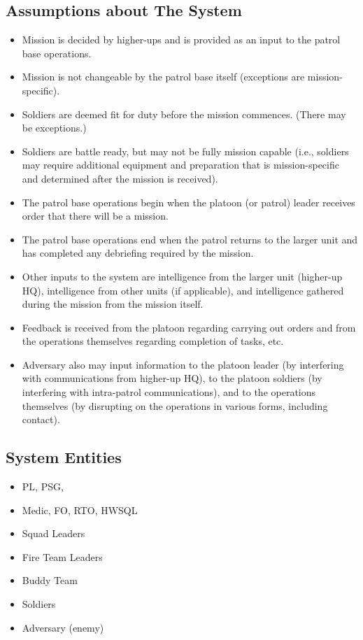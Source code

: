 \documentclass[../../main/main.tex]{subfiles}
\begin{document}
\subsection{Assumptions about The System}
\begin{itemize}
\item Mission is decided by higher-ups and is provided as an input to the patrol base operations.
\item Mission is not changeable by the patrol base itself (exceptions are mission-specific).
\item Soldiers are deemed fit for duty before the mission commences.   (There may be exceptions.)
\item Soldiers are battle ready, but may not be fully mission capable (i.e., soldiers may require additional equipment and preparation that is mission-specific and determined after the mission is received).
\item The patrol base operations begin when the platoon (or patrol) leader receives order that there will be a mission.
\item The patrol base operations end when the patrol returns to the larger unit and has completed any debriefing required by the mission.
\item Other inputs to the system are intelligence from the larger unit (higher-up HQ), intelligence from other units (if applicable), and intelligence gathered during the mission from the mission itself. 
\item Feedback is received from the platoon regarding carrying out orders and from the operations themselves regarding completion of tasks, etc.  
\item Adversary also may input information to the platoon leader (by interfering with communications from higher-up HQ), to the platoon soldiers (by interfering with intra-patrol communications), and to the operations themselves (by disrupting on the operations in various forms, including contact).
\end{itemize}

\subsection{System Entities}
\begin{itemize}
\item PL, PSG, 
\item Medic, FO, RTO, HWSQL
\item Squad Leaders
\item Fire Team Leaders
\item Buddy Team
\item Soldiers
\item Adversary (enemy)
\end{itemize}
\end{document}
